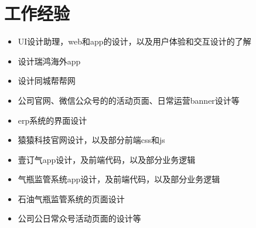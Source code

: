 \documentclass{resume}
\begin{document}
\section{工作经验}
\begin{itemize}
  \item UI设计助理，web和app的设计，以及用户体验和交互设计的了解
\end{itemize}
\begin{itemize}
  \item 设计瑞鸿海外app
  \item 设计同城帮帮网
  \item 公司官网、微信公众号的的活动页面、日常运营banner设计等
\end{itemize}
\begin{itemize}
  \item erp系统的界面设计
  \item 猿猿科技官网设计，以及部分前端css和js
\end{itemize}
\begin{itemize}
  \item 壹订气app设计，及前端代码，以及部分业务逻辑
  \item 气瓶监管系统app设计，及前端代码，以及部分业务逻辑
  \item 石油气瓶监管系统的页面设计
  \item 公司公日常众号活动页面的设计等
\end{itemize}
\end{document}
